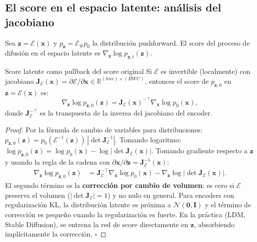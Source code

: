 \subsection{El score en el espacio latente: análisis del jacobiano}
\label{subsec:latent_score}

Sea $\bm{z} = \mathcal{E}(\bm{x})$ y $p_{\bm{z}} = \mathcal{E}_\#p_0$ la
distribución pushforward. El score del proceso de difusión en el espacio latente
es $\nabla_{\bm{z}}\log p_{\bm{z},t}(\bm{z})$.

\begin{proposicion}{Score latente como pullback del score original}
\label{prop:score_latente}
Si $\mathcal{E}$ es invertible (localmente) con jacobiano $\bm{J}_{\mathcal{E}}
(\bm{x}) = \partial\mathcal{E}/\partial\bm{x} \in \mathbb{R}^{(hwc)\times(HWC)}$,
entonces el score de $p_{\bm{z},0}$ en $\bm{z} = \mathcal{E}(\bm{x})$ es:
\begin{equation}
  \nabla_{\bm{z}}\log p_{\bm{z},0}(\bm{z})
  = \bm{J}_{\mathcal{E}}(\bm{x})^{-\top}\nabla_{\bm{x}}\log p_0(\bm{x}),
  \label{eq:score_latente}
\end{equation}
donde $\bm{J}_{\mathcal{E}}^{-\top}$ es la transpuesta de la inversa del
jacobiano del encoder.
\end{proposicion}

\begin{proof}
Por la fórmula de cambio de variables para distribuciones:
$p_{\bm{z},0}(\bm{z}) = p_0(\mathcal{E}^{-1}(\bm{z}))\,|\det\bm{J}_\mathcal{E}^{-1}|$.
Tomando logaritmo:
$\log p_{\bm{z},0}(\bm{z}) = \log p_0(\bm{x}) - \log|\det\bm{J}_\mathcal{E}(\bm{x})|$.
Tomando gradiente respecto a $\bm{z}$ y usando la regla de la cadena con
$\partial\bm{x}/\partial\bm{z} = \bm{J}_\mathcal{E}^{-1}(\bm{x})$:
\begin{align*}
  \nabla_{\bm{z}}\log p_{\bm{z},0}(\bm{z})
  &= \bm{J}_\mathcal{E}^{-\top}\nabla_{\bm{x}}\log p_0(\bm{x})
  - \nabla_{\bm{z}}\log|\det\bm{J}_\mathcal{E}(\bm{x})|.
\end{align*}
El segundo término es la \textbf{corrección por cambio de volumen}: es cero si
$\mathcal{E}$ preserva el volumen ($|\det\bm{J}_\mathcal{E}| = 1$) y no nulo
en general. Para encoders con regularización KL, la distribución latente es
próxima a $\mathcal{N}(\bm{0},\bm{I})$ y el término de corrección es pequeño
cuando la regularización es fuerte. En la práctica (LDM, Stable Diffusion),
se entrena la red de score directamente en $\bm{z}$, absorbiendo implícitamente
la corrección. $\square$
\end{proof}

